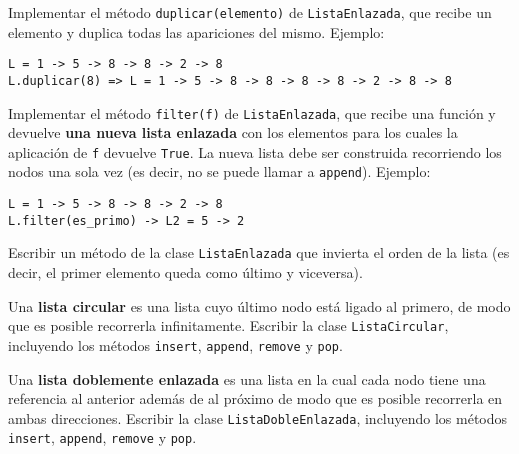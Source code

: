 \begin{ejercicio}
Implementar el método \verb|duplicar(elemento)| de \verb|ListaEnlazada|, que recibe
un elemento y duplica todas las apariciones del mismo. Ejemplo:

\begin{verbatim}
L = 1 -> 5 -> 8 -> 8 -> 2 -> 8
L.duplicar(8) => L = 1 -> 5 -> 8 -> 8 -> 8 -> 8 -> 2 -> 8 -> 8
\end{verbatim}
\end{ejercicio}

\begin{ejercicio}
Implementar el método \verb|filter(f)| de \verb|ListaEnlazada|, que recibe
una función y devuelve {\bf una nueva lista enlazada} con los elementos para los
cuales la aplicación de \verb|f| devuelve \verb|True|. La nueva lista debe ser construida
recorriendo los nodos una sola vez (es decir, no se puede llamar a \verb|append|). Ejemplo:

\begin{verbatim}
L = 1 -> 5 -> 8 -> 8 -> 2 -> 8
L.filter(es_primo) -> L2 = 5 -> 2
\end{verbatim}
\end{ejercicio}

\begin{ejercicio}
Escribir un método de la clase \verb|ListaEnlazada| que invierta el orden
de la lista (es decir, el primer elemento queda como último y
viceversa).
\end{ejercicio}

\begin{ejercicio}
Una {\bf lista circular} es una lista cuyo último nodo está ligado al primero,
de modo que es posible recorrerla infinitamente.
Escribir la clase \verb|ListaCircular|, incluyendo los métodos \verb!insert!,
\verb!append!, \verb!remove! y \verb!pop!.
\end{ejercicio}

\begin{ejercicio}
Una {\bf lista doblemente enlazada} es una lista en la cual cada nodo tiene
una referencia al anterior además de al próximo de modo que es posible
recorrerla en ambas direcciones.
Escribir la clase \verb|ListaDobleEnlazada|, incluyendo los métodos
\verb!insert!, \verb!append!, \verb!remove! y \verb!pop!.
\end{ejercicio}
